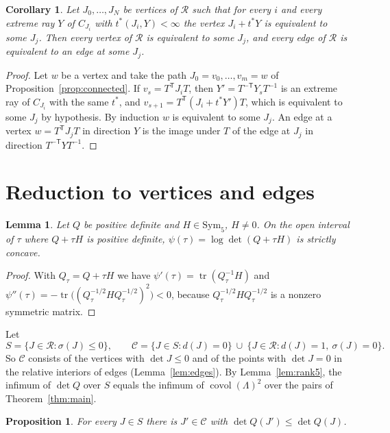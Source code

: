 \documentclass[11pt]{amsart}
\newtheorem{proposition}[theorem]{Proposition}
\newtheorem{lemma}[theorem]{Lemma}
\newtheorem{corollary}[theorem]{Corollary}
\theoremstyle{definition}
\theoremstyle{remark}
\numberwithin{equation}{section}
\numberwithin{table}{section}
\numberwithin{figure}{section}
\newcommand{\Rk}{\mathcal{R}}
\newcommand{\Sym}{\mathrm{Sym}}
\newcommand{\covol}{\operatorname{covol}}
\newcommand{\cand}{\mathcal{C}}
\newcommand{\T}{\mathsf{T}}
\begin{document}
\begin{corollary}\label{cor:closure}
Let $J_0,\dots,J_N$ be vertices of $\Rk$ such that for every $i$ and every extreme ray $Y$ of $C_{J_i}$ with $t^*(J_i,Y)<\infty$ the vertex $J_i+t^*Y$ is equivalent to some $J_j$. Then every vertex of $\Rk$ is equivalent to some $J_j$, and every edge of $\Rk$ is equivalent to an edge at some $J_j$.
\end{corollary}

\begin{proof}
Let $w$ be a vertex and take the path $J_0=v_0,\dots,v_m=w$ of Proposition~\ref{prop:connected}. If $v_s=T^\T J_iT$, then $Y'=T^{-\T}Y_sT^{-1}$ is an extreme ray of $C_{J_i}$ with the same $t^*$, and $v_{s+1}=T^\T(J_i+t^*Y')T$, which is equivalent to some $J_j$ by hypothesis. By induction $w$ is equivalent to some $J_j$. An edge at a vertex $w=T^\T J_jT$ in direction $Y$ is the image under $T$ of the edge at $J_j$ in direction $T^{-\T}YT^{-1}$.
\end{proof}

\section{Reduction to vertices and edges}\label{sec:reduction}

\begin{lemma}\label{lem:logdet}
Let $Q$ be positive definite and $H\in\Sym_5$, $H\ne0$. On the open interval of $\tau$ where $Q+\tau H$ is positive definite, $\psi(\tau)=\log\det(Q+\tau H)$ is strictly concave.
\end{lemma}

\begin{proof}
With $Q_\tau=Q+\tau H$ we have $\psi'(\tau)=\operatorname{tr}(Q_\tau^{-1}H)$ and $\psi''(\tau)=-\operatorname{tr}\bigl((Q_\tau^{-1/2}HQ_\tau^{-1/2})^2\bigr)<0$, because $Q_\tau^{-1/2}HQ_\tau^{-1/2}$ is a nonzero symmetric matrix.
\end{proof}

Let
\[
S=\{J\in\Rk:\sigma(J)\le0\},\qquad
\cand=\{J\in S: d(J)=0\}\ \cup\ \{J\in\Rk: d(J)=1,\ \sigma(J)=0\}.
\]
So $\cand$ consists of the vertices with $\det J\le0$ and of the points with $\det J=0$ in the relative interiors of edges (Lemma~\ref{lem:edges}). By Lemma~\ref{lem:rank5}, the infimum of $\det Q$ over $S$ equals the infimum of $\covol(\Lambda)^2$ over the pairs of Theorem~\ref{thm:main}.

\begin{proposition}\label{prop:descent}
For every $J\in S$ there is $J'\in\cand$ with $\det Q(J')\le\det Q(J)$.
\end{proposition}
\end{document}
